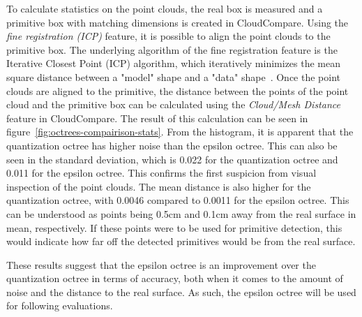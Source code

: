 To calculate statistics on the point clouds, the real box is measured and a primitive box with matching dimensions is created in CloudCompare.
Using the \textit{fine registration (ICP)} feature, it is possible to align the point clouds to the primitive box.
The underlying algorithm of the fine registration feature is the Iterative Closest Point (ICP) algorithm,
which iteratively minimizes the mean square distance between a "model" shape and a "data" shape~\cite{besl_method_1992}.
Once the point clouds are aligned to the primitive,
the distance between the points of the point cloud and the primitive box can be calculated using the \textit{Cloud/Mesh Distance} feature in CloudCompare.
The result of this calculation can be seen in figure~\ref{fig:octrees-compairison-stats}.
From the histogram, it is apparent that the quantization octree has higher noise than the epsilon octree.
This can also be seen in the standard deviation, which is 0.022 for the quantization octree and 0.011
for the epsilon octree.
This confirms the first suspicion from visual inspection of the point clouds.
The mean distance is also higher for the quantization octree, with 0.0046 compared to 0.0011 for the epsilon octree.
This can be understood as points being 0.5cm and 0.1cm away from the real surface in mean, respectively.
If these points were to be used for primitive detection, this would indicate how far off the detected primitives would be from the real surface.

These results suggest that the epsilon octree is an improvement over the quantization octree in terms of accuracy,
both when it comes to the amount of noise and the distance to the real surface.
As such, the epsilon octree will be used for following evaluations.

